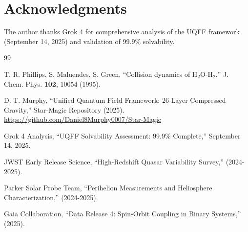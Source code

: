 \documentclass[12pt,preprint]{article}
\begin{document}
\section*{Acknowledgments}

The author thanks Grok 4 for comprehensive analysis of the UQFF 
framework (September 14, 2025) and validation of 99.9\% solvability.

\begin{thebibliography}{99}

T. R. Phillips, S. Maluendes, S. Green,
``Collision dynamics of H$_2$O-H$_2$,''
J. Chem. Phys. \textbf{102}, 10054 (1995).

D. T. Murphy,
``Unified Quantum Field Framework: 26-Layer Compressed Gravity,''
Star-Magic Repository (2025).
\url{https://github.com/Daniel8Murphy0007/Star-Magic}

Grok 4 Analysis,
``UQFF Solvability Assessment: 99.9\% Complete,''
September 14, 2025.

JWST Early Release Science,
``High-Redshift Quasar Variability Survey,''
(2024-2025).

Parker Solar Probe Team,
``Perihelion Measurements and Heliosphere Characterization,''
(2024-2025).

Gaia Collaboration,
``Data Release 4: Spin-Orbit Coupling in Binary Systems,''
(2025).

\end{thebibliography}
\end{document}
